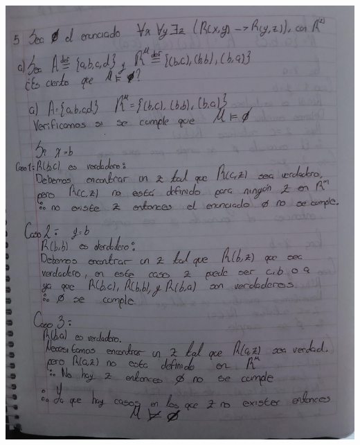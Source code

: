 \documentclass[12pt,letterpaper]{article}
\begin{document}
\begin{enumerate}
  \begin{center}
    \hspace{-1.2cm} \includegraphics[width=\textwidth,height=0.8\textheight,keepaspectratio]{ejercicio5a.png}
  \end{center}


\end{enumerate}
\end{document}
